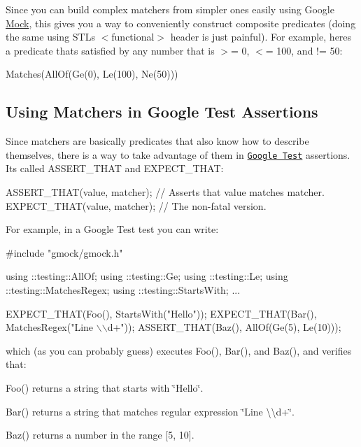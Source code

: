 Since you can build complex matchers from simpler ones easily using Google \hyperlink{classMock}{Mock}, this gives you a way to conveniently construct composite predicates (doing the same using S\+TL\textquotesingle{}s {\ttfamily $<$functional$>$} header is just painful). For example, here\textquotesingle{}s a predicate that\textquotesingle{}s satisfied by any number that is $>$= 0, $<$= 100, and != 50\+:


\begin{DoxyCode}
Matches(AllOf(Ge(0), Le(100), Ne(50)))
\end{DoxyCode}


\subsection*{Using Matchers in Google Test Assertions}

Since matchers are basically predicates that also know how to describe themselves, there is a way to take advantage of them in \href{../../googletest/}{\tt Google Test} assertions. It\textquotesingle{}s called {\ttfamily A\+S\+S\+E\+R\+T\+\_\+\+T\+H\+AT} and {\ttfamily E\+X\+P\+E\+C\+T\+\_\+\+T\+H\+AT}\+:


\begin{DoxyCode}
ASSERT\_THAT(value, matcher);  \textcolor{comment}{// Asserts that value matches matcher.}
EXPECT\_THAT(value, matcher);  \textcolor{comment}{// The non-fatal version.}
\end{DoxyCode}


For example, in a Google Test test you can write\+:


\begin{DoxyCode}
\textcolor{preprocessor}{#include "gmock/gmock.h"}

using ::testing::AllOf;
using ::testing::Ge;
using ::testing::Le;
using ::testing::MatchesRegex;
using ::testing::StartsWith;
...

  EXPECT\_THAT(Foo(), StartsWith(\textcolor{stringliteral}{"Hello"}));
  EXPECT\_THAT(Bar(), MatchesRegex(\textcolor{stringliteral}{"Line \(\backslash\)\(\backslash\)d+"}));
  ASSERT\_THAT(Baz(), AllOf(Ge(5), Le(10)));
\end{DoxyCode}


which (as you can probably guess) executes {\ttfamily Foo()}, {\ttfamily Bar()}, and {\ttfamily Baz()}, and verifies that\+:


\begin{DoxyItemize}
\item {\ttfamily Foo()} returns a string that starts with {\ttfamily \char`\"{}\+Hello\char`\"{}}.
\item {\ttfamily Bar()} returns a string that matches regular expression {\ttfamily \char`\"{}\+Line \textbackslash{}\textbackslash{}d+\char`\"{}}.
\item {\ttfamily Baz()} returns a number in the range \mbox{[}5, 10\mbox{]}.
\end{DoxyItemize}

